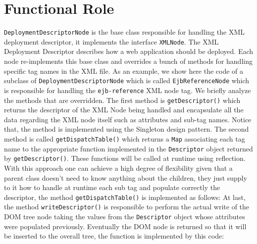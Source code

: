 \newpage
\section{Functional Role}
\texttt{DeploymentDescriptorNode} is the base class responsible for handling the XML deployment descriptor, it implements the interface \texttt{XMLNode}.\newline
The XML Deployment Descriptor describes how a web application should be deployed. Each node re-implements this base class and overrides a bunch of methods for handling specific tag names in the XML file. 
As an example, we show here the code of a subclass of \texttt{DeploymentDescriptorNode} which is called \texttt{EjbReferenceNode} which is responsible for handling the \texttt{ejb-reference} XML node tag. We briefly analyze the methods that are overridden. \newline
The first method is \texttt{getDescriptor()} which returns the descriptor of the XML Node being handled and encapsulate all the data regarding the XML node itself such as attributes and sub-tag names. 
Notice that, the method is implemented using the Singleton design pattern.\newline
The second method is called \texttt{getDispatchTable()} which returns a \texttt{Map} associating each tag name to the appropriate function implemented in the \texttt{Descriptor} object returned by \texttt{getDescriptor()}. These functions will be called at runtime using reflection. With this approach one can achieve a high degree of flexibility given that a parent class doesn't need to know anything about the children, they just supply to it how to handle at runtime each sub tag and populate correctly the descriptor, the method \texttt{getDispatchTable()} is implemented as follows:
At last, the method \texttt{writeDescriptor()} is responsible to perform the actual write of the DOM tree node taking the values from the \texttt{Descriptor} object whose attributes were populated previously. Eventually the DOM node is returned so that it will be inserted to the overall tree, the function is implemented by this code:
